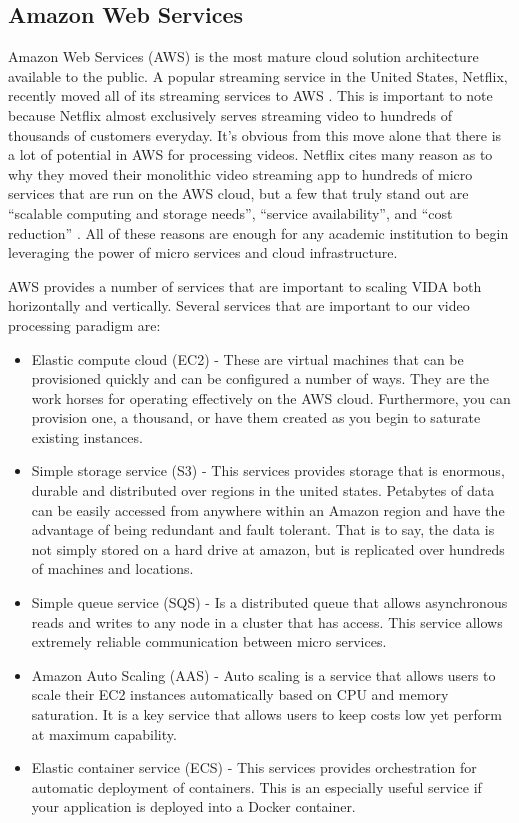 \subsection{\label{subsection:aws}Amazon Web Services}
Amazon Web Services (AWS) is the most mature cloud solution architecture
available to the public. A popular streaming service in the United States,
Netflix, recently moved all of its streaming services to AWS
\cite{netflixawsmove}. This is important to note because Netflix almost
exclusively serves streaming video to hundreds of thousands of customers
everyday. It's obvious from this move alone that there is a lot of potential in
AWS for processing videos. Netflix cites many reason as to why they moved their
monolithic video streaming app to hundreds of micro services that are run on the
AWS cloud, but a few that truly stand out are \enquote{scalable computing and
storage needs}, \enquote{service availability}, and \enquote{cost reduction}
\cite{netflixawsmove}. All of these reasons are enough for any academic
institution to begin leveraging the power of micro services and cloud
infrastructure.

AWS provides a number of services that are important to scaling VIDA
both horizontally and vertically. Several services that are important to
our video processing paradigm are:
\begin{itemize}
\item Elastic compute cloud (EC2) - These are virtual machines that can be
provisioned quickly and can be configured a number of ways. They are the work
horses for operating effectively on the AWS cloud. Furthermore, you can
provision one, a thousand, or have them created as you begin to saturate
existing instances.
\item Simple storage service (S3) - This services provides storage that is enormous,
durable and distributed over regions in the united states. Petabytes of data can
be easily accessed from anywhere within an Amazon region and have the advantage
of being redundant and fault tolerant. That is to say, the data is not simply
stored on a hard drive at amazon, but is replicated over hundreds of machines
and locations.
\item Simple queue service (SQS) - Is a distributed queue that allows asynchronous
reads and writes to any node in a cluster that has access. This service allows
extremely reliable communication between micro services.
\item Amazon Auto Scaling (AAS) - Auto scaling is a service that allows users
to scale their EC2 instances automatically based on CPU and memory saturation. It
is a key service that allows users to keep costs low yet perform at maximum
capability.
\item Elastic container service (ECS) - This services provides orchestration for
automatic deployment of containers. This is an especially useful service if
your application is deployed into a Docker container.
\end{itemize}

